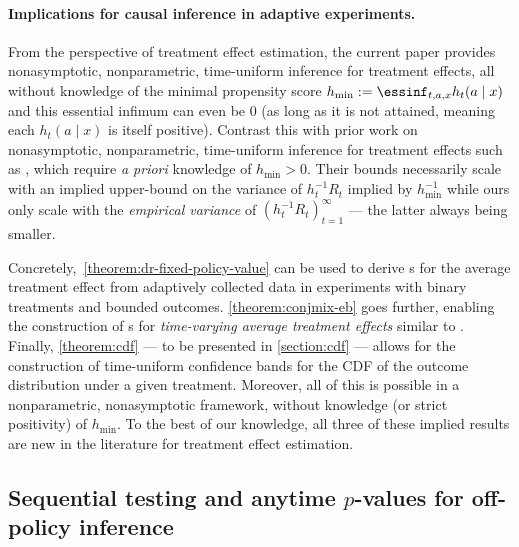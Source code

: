 \paragraph{Implications for causal inference in adaptive experiments.} From the perspective of treatment effect estimation, the current paper provides nonasymptotic, nonparametric, time-uniform inference for treatment effects, all without knowledge of the minimal propensity score $h_\mathrm{min} := \essinf_{t,a,x}h_t(a \mid x)$ and this essential infimum can even be 0 (as long as it is not attained, meaning each $h_t(a \mid x)$ is itself positive). Contrast this with prior work on nonasymptotic, nonparametric, time-uniform inference for treatment effects such as \citet[Section 4.2]{howard2018uniform}, which require \emph{a priori} knowledge of $h_\mathrm{min} > 0$. Their bounds necessarily scale with an implied upper-bound on the variance of $h_t^{-1}R_t$ implied by $h_\mathrm{min}^{-1}$ while ours only scale with the \emph{empirical variance} of $(h_t^{-1} R_t)_{t=1}^\infty$ --- the latter always being smaller.

Concretely,~\cref{theorem:dr-fixed-policy-value} can be used to derive \cs{}s for the average treatment effect from adaptively collected data in experiments with binary treatments and bounded outcomes. \cref{theorem:conjmix-eb} goes further, enabling the construction of \cs{}s for \emph{time-varying average treatment effects} similar to \citet[Section 4.2]{howard2018uniform}.
Finally, \cref{theorem:cdf} --- to be presented in \cref{section:cdf} --- allows for the construction of time-uniform confidence bands for the CDF of the outcome distribution under a given treatment.
Moreover, all of this is possible in a nonparametric, nonasymptotic framework, without knowledge (or strict positivity) of $h_\mathrm{min}$.
To the best of our knowledge, all three of these implied results are new in the literature for treatment effect estimation.


\subsection{Sequential testing and anytime \texorpdfstring{$p$}{p}-values for off-policy inference}\label{section:testing}

